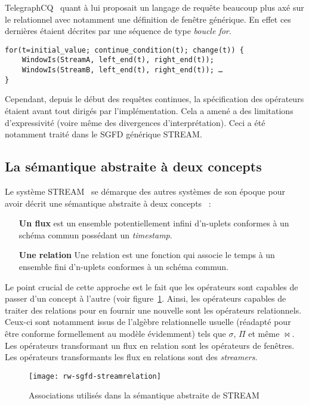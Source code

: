 TelegraphCQ~\cite{Chandrasekaran:telegraphcq} quant à lui proposait un langage de requête beaucoup plus axé sur le relationnel avec notamment une définition de fenêtre générique. En effet ces dernières étaient décrites par une séquence de type \textit{boucle for}.
\begin{center}
\begin{minipage}[c]{0.75\textwidth}
\begin{verbatim}
for(t=initial_value; continue_condition(t); change(t)) {
    WindowIs(StreamA, left_end(t), right_end(t));
    WindowIs(StreamB, left_end(t), right_end(t)); …
}
\end{verbatim}
\end{minipage}
\end{center}

Cependant, depuis le début des requêtes continues, la spécification des opérateurs étaient avant tout dirigés par l'implémentation. Cela a amené a des limitations d'expressivité (voire même des divergences d'interprétation). Ceci a été notamment traité dans le SGFD générique STREAM.

\subsection{La sémantique abstraite à deux concepts}
Le système STREAM~\cite{Widom:queries, Arasu:stream} se démarque des autres systèmes de son époque pour avoir décrit une sémantique abstraite à deux concepts~\cite{Arasu:semantic} :
\begin{itemize}
 \item[\textbf{Un flux}] est un ensemble potentiellement infini d'n-uplets conformes à un schéma commun possédant un \textit{timestamp}.
 \item[\textbf{Une relation}] Une relation est une fonction qui associe le temps à un ensemble fini d'n-uplets conformes à un schéma commun.
\end{itemize}
Le point crucial de cette approche est le fait que les opérateurs sont capables de passer d'un concept à l'autre (voir figure~\ref{fig:rw:sgfd:streamrelation}. Ainsi, les opérateurs capables de traiter des relations pour en fournir une nouvelle sont les opérateurs relationnels. Ceux-ci sont notamment issus de l'algèbre relationnelle usuelle (réadapté pour être conforme formellement au modèle évidemment) tels que $\sigma$, $\Pi$ et même $\Join$. Les opérateurs transformant un flux en relation sont les opérateurs de fenêtres. Les opérateurs transformants les flux en relations sont des \textit{streamers}.
\begin{figure}[ht]
    \centering
    \texttt{[image: rw-sgfd-streamrelation]}
    \caption{Associations utilisés dans la sémantique abstraite de STREAM}\label{fig:rw:sgfd:streamrelation}
\end{figure}

